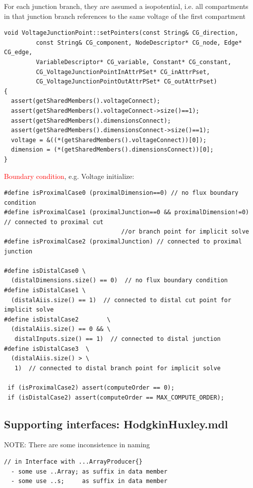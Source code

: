 For each junction branch, they are assumed a isopotential, i.e. all compartments
in that junction branch references to the same voltage of the first compartment 
\begin{verbatim}
void VoltageJunctionPoint::setPointers(const String& CG_direction, 
         const String& CG_component, NodeDescriptor* CG_node, Edge* CG_edge,
         VariableDescriptor* CG_variable, Constant* CG_constant,
         CG_VoltageJunctionPointInAttrPSet* CG_inAttrPset,
         CG_VoltageJunctionPointOutAttrPSet* CG_outAttrPset)
{
  assert(getSharedMembers().voltageConnect);
  assert(getSharedMembers().voltageConnect->size()==1);    
  assert(getSharedMembers().dimensionsConnect);
  assert(getSharedMembers().dimensionsConnect->size()==1);    
  voltage = &((*(getSharedMembers().voltageConnect))[0]);
  dimension = (*(getSharedMembers().dimensionsConnect))[0];
}
\end{verbatim}


\textcolor{red}{Boundary condition}, e.g. Voltage initialize:
{\small
\begin{lstlisting}
#define isProximalCase0 (proximalDimension==0) // no flux boundary condition
#define isProximalCase1 (proximalJunction==0 && proximalDimension!=0) // connected to proximal cut 
                                 //or branch point for implicit solve
#define isProximalCase2 (proximalJunction) // connected to proximal junction

#define isDistalCase0 \
  (distalDimensions.size() == 0)  // no flux boundary condition
#define isDistalCase1 \
  (distalAiis.size() == 1)  // connected to distal cut point for implicit solve
#define isDistalCase2        \
  (distalAiis.size() == 0 && \
   distalInputs.size() == 1)  // connected to distal junction
#define isDistalCase3  \
  (distalAiis.size() > \
   1)  // connected to distal branch point for implicit solve

 if (isProximalCase2) assert(computeOrder == 0);
 if (isDistalCase2) assert(computeOrder == MAX_COMPUTE_ORDER);

\end{lstlisting}
}

\subsection{Supporting interfaces: HodgkinHuxley.mdl}
\label{sec:HodgkinHuxley.mdl}

NOTE: There are some inconsistence in naming
\begin{verbatim}
// in Interface with ...ArrayProducer{}
  - some use ..Array; as suffix in data member  
  - some use ..s;     as suffix in data member
\end{verbatim}

